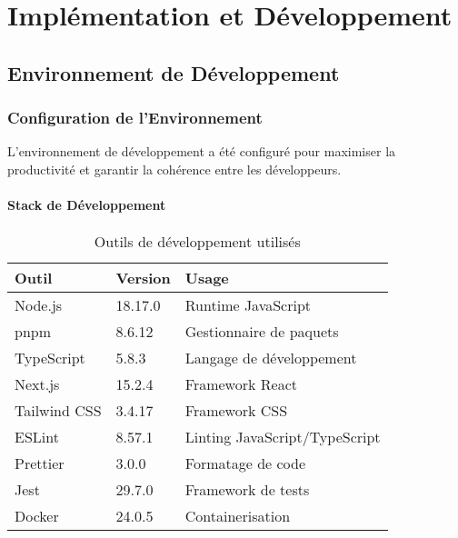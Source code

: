 \chapter{Implémentation et Développement}

\section{Environnement de Développement}

\subsection{Configuration de l'Environnement}

L'environnement de développement a été configuré pour maximiser la productivité et garantir la cohérence entre les développeurs.

\subsubsection{Stack de Développement}

\begin{table}[H]
    \centering
    \begin{tabularx}{\textwidth}{|l|X|X|}
        \hline
        \textbf{Outil} & \textbf{Version} & \textbf{Usage} \\
        \hline
        Node.js & 18.17.0 & Runtime JavaScript \\
        \hline
        pnpm & 8.6.12 & Gestionnaire de paquets \\
        \hline
        TypeScript & 5.8.3 & Langage de développement \\
        \hline
        Next.js & 15.2.4 & Framework React \\
        \hline
        Tailwind CSS & 3.4.17 & Framework CSS \\
        \hline
        ESLint & 8.57.1 & Linting JavaScript/TypeScript \\
        \hline
        Prettier & 3.0.0 & Formatage de code \\
        \hline
        Jest & 29.7.0 & Framework de tests \\
        \hline
        Docker & 24.0.5 & Containerisation \\
        \hline
    \end{tabularx}
    \caption{Outils de développement utilisés}
    \label{tab:dev_tools}
\end{table}

